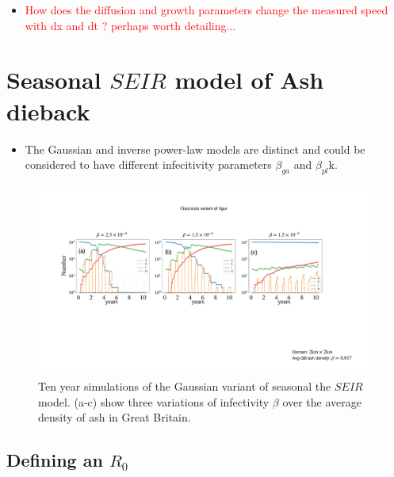 \begin{itemize}
    \item \textcolor{red}{How does the diffusion and growth parameters change the measured speed with dx and dt ? perhaps worth detailing...}
\end{itemize}
\blindtext

\blindtext


\chapter{Seasonal $SEIR$ model of Ash dieback}
\label{section:ga-SEIR-variant}
\begin{itemize}
    \item The Gaussian and inverse power-law models are distinct and could be considered to have different infecitivity parameters $\beta_{ga}$ and $\beta_{pl}$k.
\end{itemize}
\begin{figure}
    \centering
    \includegraphics[scale=0.30]{appendix/figures/A-ch6-ga-seir.pdf}
    \caption{Ten year simulations of the Gaussian variant of seasonal the $SEIR$ model. (a-c) show three variations of infectivity $\beta$ over the average density of ash in Great Britain.}
    \label{fig-ga-SEIR-variant}
\end{figure}


\section{Defining an $R_0$}


